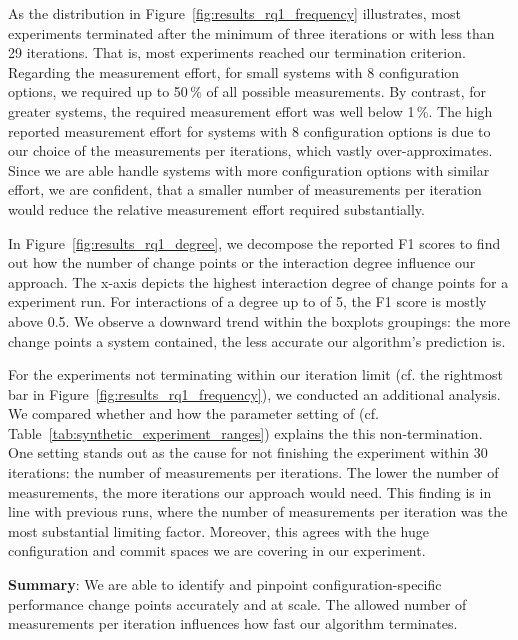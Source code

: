 \documentclass[sigconf]{acmart}
\newcommand{\greybox}[1]{
	\begin{mdframed}[backgroundcolor=black!10!white,linewidth=0pt,backgroundcolor=black!10,linewidth=0pt,innerleftmargin=5pt,innertopmargin=5pt]
		#1
	\end{mdframed}
}
\begin{document}
	As the distribution in Figure~\ref{fig:results_rq1_frequency} illustrates, most experiments terminated after the minimum of three iterations or with less than 29 iterations. That is, most experiments reached our termination criterion. 
	Regarding the measurement effort, for small systems with 8 configuration options, we required up to 50\,\% of all possible measurements. By contrast, for greater systems, the required measurement effort was well below 1\,\%. The high reported measurement effort for systems with 8 configuration options is due to our choice of the measurements per iterations, which vastly over-approximates. Since we are able handle systems with more configuration options with similar effort, we are confident, that a smaller number of measurements per iteration would reduce the relative measurement effort required substantially.
	
	In Figure~\ref{fig:results_rq1_degree}, we decompose the reported F1 scores to find out how the number of change points or the interaction degree influence our approach. The x-axis depicts the highest interaction degree of change points for a experiment run. For interactions of a degree up to of 5, the F1 score is mostly above 0.5. We observe a downward trend within the boxplots groupings: the more change points a system contained, the less accurate our algorithm's prediction is.
	
	For the experiments not terminating within our iteration limit (cf. the rightmost bar in Figure~\ref{fig:results_rq1_frequency}), we conducted an additional analysis. We compared whether and how the parameter setting of (cf. Table~\ref{tab:synthetic_experiment_ranges}) explains the this non-termination. One setting stands out as the cause for not finishing the experiment within 30 iterations: the number of measurements per iterations. The lower the number of measurements, the more iterations our approach would need. This finding is in line with previous runs, where the number of measurements per iteration was the most substantial limiting factor. Moreover, this agrees with the huge configuration and commit spaces we are covering in our experiment. 
	\vspace{2mm}
	\greybox{
		\textbf{Summary}: We are able to identify and pinpoint configuration-specific performance change points accurately and at scale. The allowed number of measurements per iteration influences how fast our algorithm terminates.
	}
	
\end{document}
